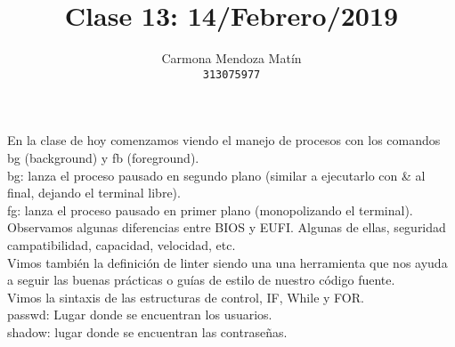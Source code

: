 \documentclass[11pt, a4paper]{report}
\begin{document}
\title{Clase 13: 14/Febrero/2019}
\author{
  Carmona Mendoza Mat\'in\\
  \texttt{313075977}
}
\date{}
\maketitle

En la clase de hoy comenzamos viendo el manejo de procesos con los comandos
bg (background) y fb (foreground). \\

bg: lanza el proceso pausado en segundo plano (similar a ejecutarlo
con \& al final, dejando el terminal libre). \\

fg: lanza el proceso pausado en primer plano (monopolizando el terminal). \\

Observamos algunas diferencias entre BIOS y EUFI. Algunas de ellas,
seguridad campatibilidad, capacidad, velocidad, etc. \\

Vimos también la definición de linter siendo una una herramienta que nos
ayuda a seguir las buenas prácticas o guías de estilo de nuestro código
fuente.\\

Vimos la sintaxis de las estructuras de control, IF, While y FOR. \\

passwd: Lugar donde se encuentran los usuarios. \\

shadow: lugar donde se encuentran las contraseñas.\\
\end{document}
